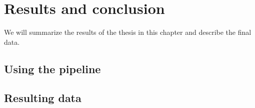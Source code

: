 \chapter[Results and conclusion]{Results and conclusion}
\label{kap:results}

We will summarize the results of the thesis in this chapter and describe the final data. 

\section{Using the pipeline}

\section{Resulting data}



